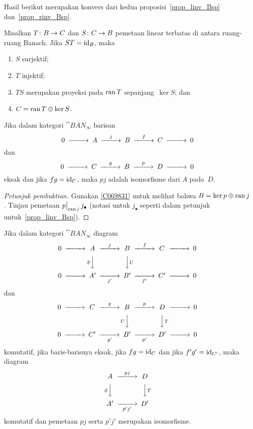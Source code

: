 Hasil berikut merupakan konvers dari kedua proposisi~\ref{prop_linv_Bsp} dan~\ref{prop_rinv_Bsp}.

\begin{prop}\label{C069831} Misalkan $T \colon B \rightarrow C$ dan $S\colon C \rightarrow B$ pemetaan linear terbatas di antara ruang-ruang
Banach. Jika $ST = \operatorname{id}_{B}$, maka
 \begin{enumerate}[label=\rm{(\alph*)}]
  \item[(a)] $S$ surjektif;
  \item[(b)] $T$ injektif;
  \item[(c)] $TS$ merupakan proyeksi pada $\operatorname{ran} T$ sepanjang~$\ker S$; dan
  \item[(d)] $C = \operatorname{ran} T \oplus \ker S$.
 \end{enumerate}
\end{prop}

\begin{prop} Jika dalam kategori $\cat{BAN_\infty}$ barisan
 \[ \begin{CD} 0 @>>> A @>j>> B @>f>> C @>>> 0
    \end{CD}\]
 dan
 \[ \begin{CD} 0 @>>> C @>g>> B @>p>> D @>>> 0
    \end{CD}\]
eksak dan jika $fg = \operatorname{id}_{C}$, maka $pj$ adalah isomorfisme dari $A$ pada~$D$.
\end{prop}

\begin{proof}[\emph{Petunjuk pembuktian}] Gunakan \ref{C069831} untuk melihat bahwa $B = \ker p \oplus \operatorname{ran} j$. Tinjau pemetaan
$\bigl.p\bigr|_{\operatorname{ran} j}\,j_\bullet$ (notasi untuk $j_\bullet$ seperti dalam petunjuk untuk~\ref{prop_linv_Bsp}). \ns
\end{proof}

\begin{prop}\label{prop_merge_exactCD} Jika dalam kategori $\cat{BAN_\infty}$ diagram
 \begin{equation} \begin{CD} 0 @>>> A @>j>> B @>f>> C @>>> 0  \\
      @.   @VSVV   @VVUV   @.    @.    \\
 0 @>>> A' @>>j'> B' @>>f'> C' @>>> 0
    \end{CD}\end{equation}
dan
 \[ \begin{CD} 0 @>>> C @>g>> B @>p>> D @>>> 0   \\
      @.     @.   @VUVV   @VVTV     @.  \\
  0 @>>> C' @>>g'> B' @>>p'> D' @>>> 0
    \end{CD}\]
komutatif, jika baris-barisnya eksak, jika $fg = \operatorname{id}_{C}$ dan jika $f'g' = \operatorname{id}_{C'}$, maka diagram
 \[ \begin{CD}  A  @>pj>>  D   \\
       @VSVV   @VVTV  \\
     A'  @>>p'j'> D'
    \end{CD}\]
komutatif dan pemetaan $pj$ serta $p'j'$ merupakan isomorfisme.
\end{prop}

